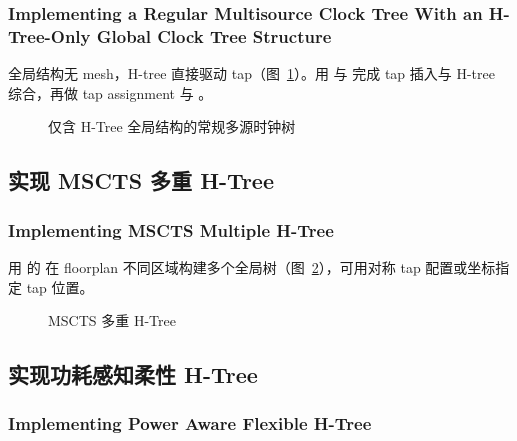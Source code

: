 \subsubsection*{Implementing a Regular Multisource Clock Tree With an H-Tree-Only Global Clock Tree Structure}

全局结构无 mesh，H-tree 直接驱动 tap（图~\ref{fig:mscts-htree-only}）。用  与  完成 tap 插入与 H-tree 综合，再做 tap assignment 与 。

\begin{figure}[htbp]
\centering
{}
\caption{仅含 H-Tree 全局结构的常规多源时钟树}
\label{fig:mscts-htree-only}
\end{figure}

\subsection{实现 MSCTS 多重 H-Tree}
\subsubsection*{Implementing MSCTS Multiple H-Tree}

用  的  在 floorplan 不同区域构建多个全局树（图~\ref{fig:mscts-multi-h}），可用对称 tap 配置或坐标指定 tap 位置。

\begin{figure}[htbp]
\centering
{}
\caption{MSCTS 多重 H-Tree}
\label{fig:mscts-multi-h}
\end{figure}

\subsection{实现功耗感知柔性 H-Tree}
\subsubsection*{Implementing Power Aware Flexible H-Tree}

